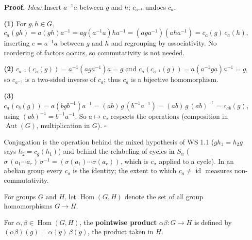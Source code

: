 \documentclass[11pt]{report}
\renewenvironment{proof}[1][Proof]{\noindent\textbf{#1.} }{\hfill$\square$\par\vspace{5pt}}
\begin{document}
\begin{proof}
\textit{Idea:} Insert $a^{-1}a$ between $g$ and $h$; $c_{a^{-1}}$ undoes $c_a$.\par
\textbf{(1)} For $g, h \in G$,
\[ c_a(gh) = a (gh) a^{-1} = a g (a^{-1} a) h a^{-1} = (a g a^{-1})(a h a^{-1}) = c_a(g)\, c_a(h), \]
inserting $e = a^{-1}a$ between $g$ and $h$ and regrouping by associativity. No reordering of factors occurs, so commutativity is not needed.

\textbf{(2)} $c_{a^{-1}}(c_a(g)) = a^{-1}(a g a^{-1}) a = g$ and $c_a(c_{a^{-1}}(g)) = a(a^{-1} g a)a^{-1} = g$, so $c_{a^{-1}}$ is a two-sided inverse of $c_a$; thus $c_a$ is a bijective homomorphism.

\textbf{(3)} $c_a(c_b(g)) = a (b g b^{-1}) a^{-1} = (ab)\, g\, (b^{-1} a^{-1}) = (ab)\, g\, (ab)^{-1} = c_{ab}(g)$, using $(ab)^{-1} = b^{-1}a^{-1}$. So $a \mapsto c_a$ respects the operations (composition in $\operatorname{Aut}(G)$, multiplication in $G$).
\end{proof}

\begin{rembox}\label{rem:earlier-occurrences-conjugation}
Conjugation is the operation behind the mixed hypothesis of WS 1.1 ($g h_1 = h_2 g$ says $h_2 = c_g(h_1)$) and behind the relabeling of cycles in $S_n$ ($\sigma\,(a_1 \cdots a_r)\,\sigma^{-1} = (\sigma(a_1) \cdots \sigma(a_r))$, which is $c_\sigma$ applied to a cycle). In an abelian group every $c_a$ is the identity; the extent to which $c_a \neq \operatorname{id}$ measures non-commutativity.
\end{rembox}

\begin{defbox}\label{def:hom-g-h-pointwise-product}
For groups $G$ and $H$, let $\operatorname{Hom}(G, H)$ denote the set of all group homomorphisms $G \to H$.
\end{defbox}

\begin{defbox}\label{def:pointwise-product}
For $\alpha, \beta \in \operatorname{Hom}(G, H)$, the \textbf{pointwise product} $\alpha\beta: G \to H$ is defined by $(\alpha\beta)(g) = \alpha(g)\,\beta(g)$, the product taken in $H$.
\end{defbox}
\end{document}
